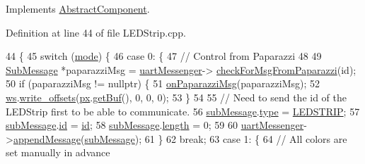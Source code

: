 Implements \hyperlink{class_abstract_component_af25a90b8ab213762221c3b358d9873f3}{Abstract\+Component}.



Definition at line 44 of file L\+E\+D\+Strip.\+cpp.


\begin{DoxyCode}
44                       \{
45     \textcolor{keywordflow}{switch} (\hyperlink{class_l_e_d_strip_ac209f99d6a633cd4c672fc16a991f4f8}{mode}) \{
46         \textcolor{keywordflow}{case} 0: \{
47             \textcolor{comment}{// Control from Paparazzi}
48 
49             \hyperlink{struct_sub_message}{SubMessage} *paparazziMsg = \hyperlink{class_l_e_d_strip_a4387042fe2a80bcd5dc3e9d7524800ae}{uartMessenger}->
      \hyperlink{class_u_a_r_t_messenger_affb33ad31e70001505e14d02e1f8a018}{checkForMsgFromPaparazzi}(\textcolor{keywordtype}{id});
50             \textcolor{keywordflow}{if} (paparazziMsg != \textcolor{keyword}{nullptr}) \{
51                 \hyperlink{class_l_e_d_strip_af9708cc14c0e3f75e5b3c268b398f436}{onPaparazziMsg}(paparazziMsg);
52                 \hyperlink{class_l_e_d_strip_a81c4bffd481d09defe63642c9e69ed17}{ws}.\hyperlink{class_w_s2812_a578fd0b278445bd6f84e260a69b18a68}{write\_offsets}(\hyperlink{class_l_e_d_strip_aa8a8764862dbb64aedc0b53cfe3fc22b}{px}.\hyperlink{class_pixel_array_a987f1dc053a5cf25d78d5cfe037088d3}{getBuf}(), 0, 0, 0);
53             \}
54 
55             \textcolor{comment}{//  Need to send the id of the LEDStrip first to be able to communicate.}
56             \hyperlink{class_l_e_d_strip_a25cf156735c1629b92b8dfe7a54e9b41}{subMessage}.\hyperlink{struct_sub_message_a064f1d26d553da776dc749d37a18a499}{type} = \hyperlink{_sub_message_8h_a81f78fc173dedefe5a049c0aa3eed2c0affd2d0d3f226452ef4313ef1080ea581}{LEDSTRIP};
57             \hyperlink{class_l_e_d_strip_a25cf156735c1629b92b8dfe7a54e9b41}{subMessage}.\hyperlink{struct_sub_message_af3acc450c0686d7a9d15ccd9d548cb6d}{id} = \hyperlink{class_abstract_component_a9c9c548149681b1a1dd935e66ed5dd11}{id};
58             \hyperlink{class_l_e_d_strip_a25cf156735c1629b92b8dfe7a54e9b41}{subMessage}.\hyperlink{struct_sub_message_a276e06f5335ca7857c21ac8c0e51bd6d}{length} = 0;
59 
60             \hyperlink{class_l_e_d_strip_a4387042fe2a80bcd5dc3e9d7524800ae}{uartMessenger}->\hyperlink{class_u_a_r_t_messenger_ada0967869e320c236a211b405abf128a}{appendMessage}(\hyperlink{class_l_e_d_strip_a25cf156735c1629b92b8dfe7a54e9b41}{subMessage});
61         \}
62             \textcolor{keywordflow}{break};
63         \textcolor{keywordflow}{case} 1: \{
64             \textcolor{comment}{// All colors are set manually in advance}

\end{DoxyCode}
